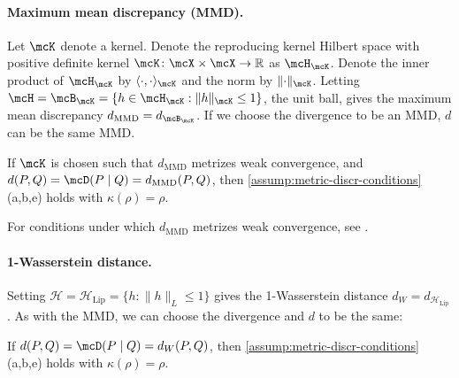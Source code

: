 \paragraph{Maximum mean discrepancy (MMD).}
Let $\mcK $ denote a kernel.
Denote the reproducing kernel Hilbert space with positive definite kernel $\mcK \colon \mcX \times \mcX \to \reals$ as $\mcH_{\mcK}$.
Denote the inner product of $\mcH_{\mcK}$ by $\langle{\cdot},{\cdot}\rangle_{\mcK}$ and the norm by $\|{\cdot}\|_{\mcK}$.
Letting $\mcH = \mcB_{\mcK} = \{ h \in \mcH_{\mcK} :  \|h\|_{\mcK} \le 1\}$, the unit ball, gives the maximum mean discrepancy $d_{\mathrm{MMD}} = d_{\mcB_{\mcK}}$.
If we choose the divergence to be an MMD, $d$ can be the same MMD.
\begin{proposition} 	\label{coro:MMD}
	If $\mcK$ is chosen such that $d_{\mathrm{MMD}}$ metrizes weak convergence, and
	$d(P, Q) =  \discr{P}{Q} = d_{\mathrm{MMD}}(P,Q)$,
	then \cref{assump:metric-discr-conditions}(a,b,e) holds with $\kappa(\rho) = \rho$.
\end{proposition}

For conditions under which $d_{\mathrm{MMD}}$ metrizes weak convergence, see
\citet{Sriperumbudur:2010,Simon:2020}.

\paragraph{1-Wasserstein distance.}
Setting $\mathcal{H} = \mathcal{H}_{\text{Lip}} = \{ h : \| h \|_L \leq 1 \}$ gives the 1-Wasserstein distance $d_W = d_{\mathcal{H}_{\text{Lip}}}$.
As with the MMD, we can choose the divergence and $d$ to be the same:
\begin{proposition}
	\label{prop:wasserstein}
	If $d(P, Q) = \discr{P}{Q} = d_W(P, Q)$, then \cref{assump:metric-discr-conditions}(a,b,e) holds with $\kappa(\rho) = \rho$.
\end{proposition}



